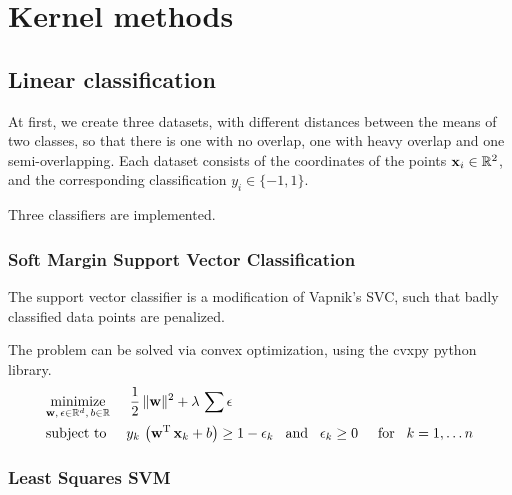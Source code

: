 \section{Kernel methods}

\subsection{Linear classification}

At first, we create three datasets, with different distances between
the means of two classes, so that there is one with no overlap,
one with heavy overlap and one semi-overlapping.
Each dataset consists of the coordinates of the points $\boldsymbol{\mathrm{x}}_i\in\mathbb{R}^2$,
and the corresponding classification $y_i\in\{-1, 1\}$.

Three classifiers are implemented.

\subsubsection*{Soft Margin Support Vector Classification}


The support vector classifier is a modification of Vapnik's SVC, such that
badly classified data points are penalized.

The problem can be solved via convex optimization, using the cvxpy python library.
\begin{equation}
\begin{split}
	&\underset{\boldsymbol{\mathrm{w}},\,\epsilon\in\mathbb{R}^d,\,b\in\mathbb{R}}{\operatorname{minimize}}\hspace{5mm}
		\frac{1}{2}\,\lVert\boldsymbol{\mathrm{w}}\rVert^2 + \lambda\,\sum\epsilon\\
	&\text{subject to}\hspace{5mm}
		y_k\,\left(\boldsymbol{\mathrm{w}}\textsuperscript{T}\,\boldsymbol{\mathrm{x}}_k + b\right)\geq1-\epsilon_k\hspace{3mm}\text{and}\hspace{3mm}\epsilon_k\geq0\hspace{5mm}\text{for}\hspace{3mm} k=1,\dots n
\end{split}
\end{equation}

\subsubsection*{Least Squares SVM}

